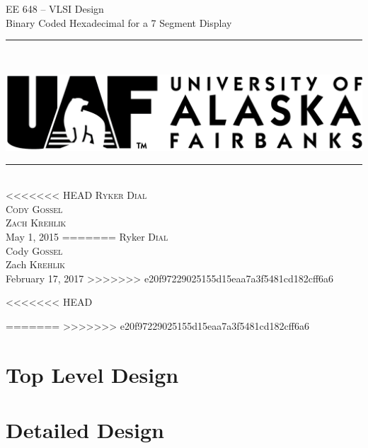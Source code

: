 \documentclass[12pt]{article}
\newcommand{\boldrule}{\rule{\linewidth}{2pt}} %
\begin{document}
\thispagestyle{empty}
\newpage
\vspace*{3cm}
\begin{center}
{\Huge EE 648 -- VLSI Design\\[.5cm]
Binary Coded Hexadecimal for a 7 Segment Display}
\end{center}
\vspace{5mm}
\boldrule\\
\begin{center}
\includegraphics{uaflogo.png}\\[.5cm]
\boldrule\\[3cm]
{\Large
<<<<<<< HEAD
\textsc{Ryker Dial}\\
\textsc{Cody Gossel}\\
\textsc{Zach Krehlik}\\[1cm]
May 1, 2015
=======
Ryker \textsc{Dial}\\
Cody \textsc{Gossel}\\
Zach \textsc{Krehlik}\\[1cm]
February 17, 2017
>>>>>>> e20f97229025155d15eaa7a3f5481cd182cff6a6
}
\end{center}


\newpage

\thispagestyle{empty}
\tableofcontents

\newpage
<<<<<<< HEAD

\setcounter{page}{1}
=======
>>>>>>> e20f97229025155d15eaa7a3f5481cd182cff6a6

\section{Top Level Design}

\section{Detailed Design}
\end{document}
